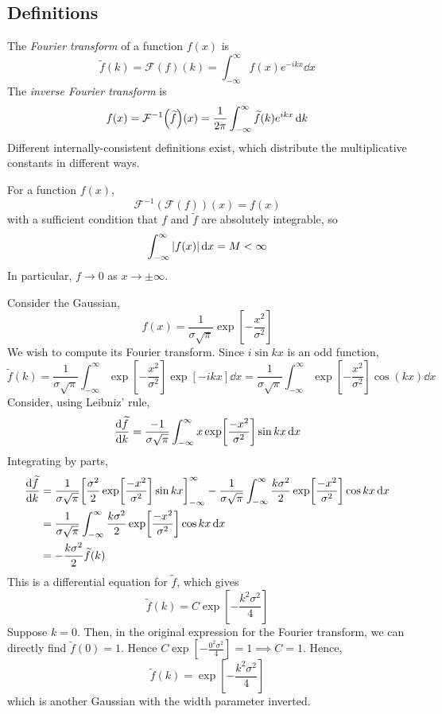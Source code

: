 \subsection{Definitions}
\begin{definition}
	The \textit{Fourier transform} of a function \( f(x) \) is
	\[
		\widetilde f(k) = \mathcal F(f)(k) = \int_{-\infty}^\infty f(x) e^{-ikx} \dd{x}
	\]
	The \textit{inverse Fourier transform} is
	\[
		f(x) = \mathcal F^{-1}\qty(\widetilde f)(x) = \frac{1}{2\pi} \int_{-\infty}^\infty \widetilde f(k) e^{ikx} \dd{k}
	\]
	Different internally-consistent definitions exist, which distribute the multiplicative constants in different ways.
\end{definition}
\begin{theorem}
	For a function \( f(x) \),
	\[
		\mathcal F^{-1} (\mathcal F (f))(x) = f(x)
	\]
	with a sufficient condition that \( f \) and \( \widetilde f \) are absolutely integrable, so
	\[
		\int_{-\infty}^\infty \abs{f(x)} \dd{x} = M < \infty
	\]
	In particular, \( f \to 0 \) as \( x \to \pm \infty \).
\end{theorem}
\begin{example}
	Consider the Gaussian,
	\[
		f(x) = \frac{1}{\sigma \sqrt{\pi}} \exp[-\frac{x^2}{\sigma^2}]
	\]
	We wish to compute its Fourier transform.
	Since \( i \sin kx \) is an odd function,
	\[
		\widetilde f(k) = \frac{1}{\sigma \sqrt{\pi}} \int_{-\infty}^\infty \exp[-\frac{x^2}{\sigma^2}] \exp[-ikx] \dd{x} = \frac{1}{\sigma \sqrt{\pi}} \int_{-\infty}^\infty \exp[-\frac{x^2}{\sigma^2}] \cos(kx) \dd{x}
	\]
	Consider, using Leibniz' rule,
	\[
		\dv{\widetilde f}{k} = \frac{-1}{\sigma \sqrt{\pi}} \int_{-\infty}^\infty x\exp[\frac{-x^2}{\sigma^2}] \sin kx \dd{x}
	\]
	Integrating by parts,
	\begin{align*}
		\dv{\widetilde f}{k} & = \frac{1}{\sigma \sqrt{\pi}} \qty[\frac{\sigma^2}{2} \exp[\frac{-x^2}{\sigma^2}] \sin kx]_{-\infty}^\infty - \frac{1}{\sigma \sqrt{\pi}} \int_{-\infty}^\infty \frac{k\sigma^2}{2} \exp[\frac{-x^2}{\sigma^2}] \cos kx \dd{x} \\
		                     & = \frac{1}{\sigma \sqrt{\pi}} \int_{-\infty}^\infty \frac{k\sigma^2}{2} \exp[\frac{-x^2}{\sigma^2}] \cos kx \dd{x}                                                                                                             \\
		                     & = -\frac{k\sigma^2}{2} \widetilde f(k)
	\end{align*}
	This is a differential equation for \( \widetilde f \), which gives
	\[
		\widetilde f(k) = C \exp[-\frac{k^2\sigma^2}{4}]
	\]
	Suppose \( k = 0 \).
	Then, in the original expression for the Fourier transform, we can directly find \( \widetilde f(0) = 1 \).
	Hence \( C \exp[-\frac{0^2\sigma^2}{4}] = 1 \implies C = 1 \).
	Hence,
	\[
		\widetilde f(k) = \exp[-\frac{k^2\sigma^2}{4}]
	\]
	which is another Gaussian with the width parameter inverted.
\end{example}

